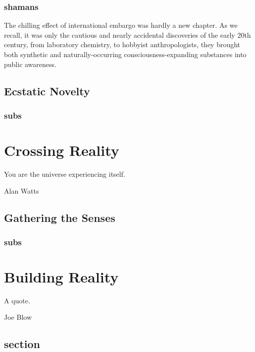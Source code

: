 \documentclass{UIdahoMastersThesis}
\begin{document}
\subsection{shamans}

The chilling effect of international embargo was hardly a new chapter. As we recall, it was only the cautious and nearly accidental discoveries of the early 20th century, from laboratory chemistry, to hobbyist anthropologists, they brought both synthetic and naturally-occurring consciousness-expanding substances into public awareness. 

\section{Ecstatic Novelty}


\subsection{subs}

\chapter{Crossing Reality}
\label{Chapter:CrossingReality}
\epigraph {You are the universe experiencing itself.}{Alan Watts}

\vspace{9mm}

\section{Gathering the Senses}

\subsection{subs}

\chapter{Building Reality}
\label{Chapter:BuildingReality}
\epigraph {A quote.}{Joe Blow}

\vspace{9mm}


\section{section}
\end{document}
